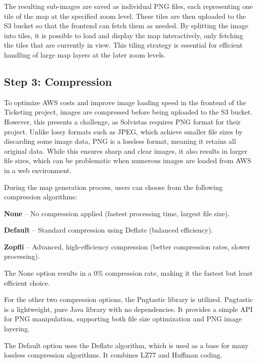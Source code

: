 The resulting sub-images are saved as individual PNG files, each representing one tile of the map at the specified zoom level. These tiles are then uploaded to the S3 bucket so that the frontend can fetch them as needed. By splitting the image into tiles, it is possible to load and display the map interactively, only fetching the tiles that are currently in view. This tiling strategy is essential for efficient handling of large map layers at the later zoom levels.

\subsection{Step 3: Compression}

To optimize AWS costs and improve image loading speed in the frontend of the Ticketing project, images are compressed before being uploaded to the S3 bucket. However, this presents a challenge, as Solvistas requires PNG format for their project. Unlike lossy formats such as JPEG, which achieve smaller file sizes by discarding some image data, PNG is a lossless format, meaning it retains all original data. While this ensures sharp and clear images, it also results in larger file sizes, which can be problematic when numerous images are loaded from AWS in a web environment.


During the map generation process, users can choose from the following compression algorithms:

\begin{compactitem}
    
\item{}\textbf{None} – No compression applied (fastest processing time, largest file size).
\item{}\textbf{Default} – Standard compression using Deflate (balanced efficiency).
\item{}\textbf{Zopfli} – Advanced, high-efficiency compression (better compression rates, slower processing).
\end{compactitem}

The None option results in a 0\% compression rate, making it the fastest but least efficient choice.

For the other two compression options, the Pngtastic library is utilized. Pngtastic is a lightweight, pure Java library with no dependencies. It provides a simple API for PNG manipulation, supporting both file size optimization and PNG image layering.

The Default option uses the Deflate algorithm, which is used as a base for many lossless compression algorithms. It combines LZ77 and Huffman coding.

